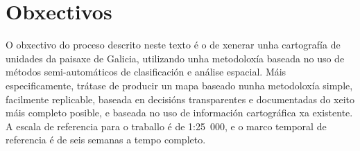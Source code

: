 \documentclass[11pt,a4paper]{article}
\begin{document}




\section{Obxectivos}

O obxectivo do proceso descrito neste texto é o de xenerar unha cartografía de unidades da paisaxe de Galicia, utilizando unha metodoloxía baseada no uso de métodos semi-automáticos de clasificación e análise espacial. Máis especificamente, trátase de producir un mapa baseado nunha metodoloxía simple, facilmente replicable, baseada en decisións transparentes e documentadas do xeito máis completo posible, e baseada no uso de información cartográfica xa existente. A escala de referencia para o traballo é de 1:25~000, e o marco temporal de referencia é de seis semanas a tempo completo.
\end{document}
